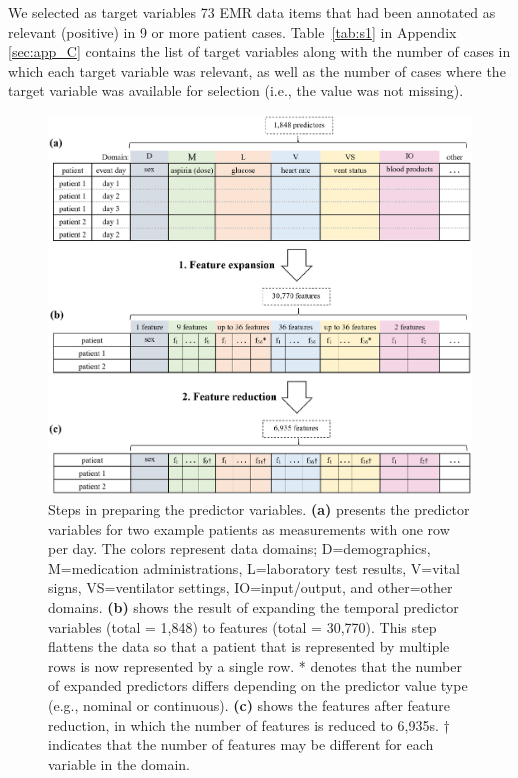 We selected as target variables 73 EMR data items that had been annotated as relevant (positive) in 9 or more patient cases. Table~\ref{tab:s1} in Appendix \ref{sec:app_C} contains the list of target variables along with the number of cases in which each target variable was relevant, as well as the number of cases where the target variable was available for selection (i.e., the value was not missing). 

\begin{figure}[!h]
    \centering
    \includegraphics[width=\textwidth]{./pictures/Figure1}
    \caption{
    Steps in preparing the predictor variables. \textbf{(a)} presents the predictor variables for two example patients as measurements with one row per day. The colors represent data domains; D=demographics, M=medication administrations, L=laboratory test results, V=vital signs, VS=ventilator settings, IO=input/output, and other=other domains. \textbf{(b)} shows the result of expanding the temporal predictor variables (total = 1,848) to features (total = 30,770). This step flattens the data so that a patient that is represented by multiple rows is now represented by a single row. * denotes that the number of expanded predictors differs depending on the predictor value type (e.g., nominal or continuous). \textbf{(c)} shows the features after feature reduction, in which the number of features is reduced to 6,935s. † indicates that the number of features may be different for each variable in the domain.
    }\label{fig:1}
\end{figure}

